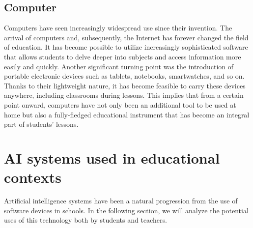 \documentclass[a4paper,12pt]{article}
\begin{document}
\subsection{Computer}
Computers have seen increasingly widespread use since their invention. The arrival of computers and, subsequently, the Internet has forever changed the field of education. 
It has become possible to utilize increasingly sophisticated software that allows students to delve deeper into subjects and access information more easily and quickly.
Another significant turning point was the introduction of portable electronic devices such as tablets, notebooks, smartwatches, and so on. 
Thanks to their lightweight nature, it has become feasible to carry these devices anywhere, including classrooms during lessons.
This implies that from a certain point onward, computers have not only been an additional tool to be used at home but also a fully-fledged educational instrument that has become an integral part of students' lessons.

\section{AI systems used in educational contexts}
Artificial intelligence systems have been a natural progression from the use of software devices in schools. In the following section, we will analyze the potential uses of this technology both by students and teachers.
\\ \newline

\end{document}
